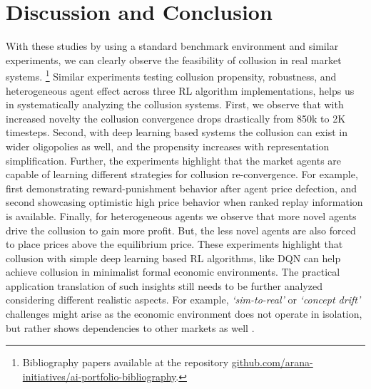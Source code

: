 \documentclass{article}
\begin{document}
\section{Discussion and Conclusion}


With these studies by using a standard benchmark environment and similar experiments, we can clearly observe the feasibility of collusion in real market systems.
\footnote{Bibliography papers available at the repository \href{https://github.com/arana-initiatives/ai-portfolio-bibliography}{github.com/arana-initiatives/ai-portfolio-bibliography}.}
Similar experiments testing collusion propensity, robustness, and heterogeneous agent effect across three RL algorithm implementations, helps us in systematically analyzing the collusion systems.
First, we observe that with increased novelty the collusion convergence drops drastically from 850k to 2K timesteps.
Second, with deep learning based systems the collusion can exist in wider oligopolies as well, and the propensity increases with representation simplification.
Further, the experiments highlight that the market agents are capable of learning different strategies for collusion re-convergence.
For example, first demonstrating reward-punishment behavior after agent price defection, and second showcasing optimistic high price behavior when ranked replay information is available.
Finally, for heterogeneous agents we observe that more novel agents drive the collusion to gain more profit.
But, the less novel agents are also forced to place prices above the equilibrium price.
These experiments highlight that collusion with simple deep learning based RL algorithms, like DQN can help achieve collusion in minimalist formal economic environments.
The practical application translation of such insights still needs to be further analyzed considering different realistic aspects.
For example, \textit{`sim-to-real’} or \textit{`concept drift’} challenges might arise as the economic environment does not operate in isolation, but rather shows dependencies to other markets as well \cite{lu2018learning, zhao2020sim}.
\end{document}
